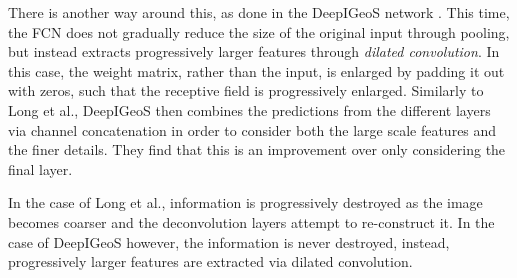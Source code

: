 There is another way around this, as done in the DeepIGeoS network \cite{deepIGeoS}. This time, the FCN does not gradually reduce the size of the original input through pooling, but instead extracts progressively larger features through \textit{dilated convolution}. In this case, the weight matrix, rather than the input, is enlarged by padding it out with zeros, such that the receptive field is progressively enlarged. Similarly to Long et al., DeepIGeoS then combines the predictions from the different layers via channel concatenation in order to consider both the large scale features and the finer details. They find that this is an improvement over only considering the final layer. 

In the case of Long et al., information is progressively destroyed as the image becomes coarser and the deconvolution layers attempt to re-construct it. In the case of DeepIGeoS however, the information is never destroyed, instead, progressively larger features are extracted via dilated convolution.